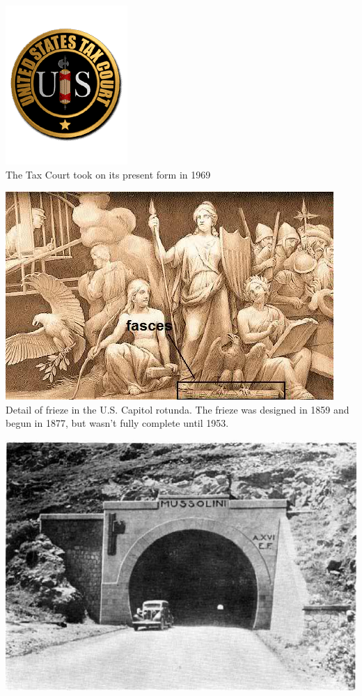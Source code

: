 \begin{frame}
    \centering
    \includegraphics[height=.8\textheight]{img/fasces/tax-court.png} \\
    The Tax Court took on its present form in 1969 \\
\end{frame}
\begin{frame}
    \centering
    \includegraphics[height=.8\textheight]{img/fasces/teut1.jpg} \\
    Detail of frieze in the U.S. Capitol rotunda. The frieze was designed in 1859 and begun in 1877, but wasn't fully complete until 1953. \\
\end{frame}
\begin{frame}
    \centering
    \includegraphics[width=.9\textwidth]{img/fasces/tunnel.jpg} \\
\end{frame}
